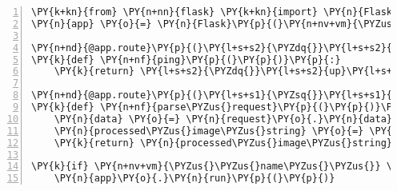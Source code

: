 \begin{Verbatim}[commandchars=\\\{\},numbers=left,firstnumber=1,stepnumber=1]
\PY{k+kn}{from} \PY{n+nn}{flask} \PY{k+kn}{import} \PY{n}{Flask}
\PY{n}{app} \PY{o}{=} \PY{n}{Flask}\PY{p}{(}\PY{n+nv+vm}{\PYZus{}\PYZus{}name\PYZus{}\PYZus{}}\PY{p}{)}
 
\PY{n+nd}{@app.route}\PY{p}{(}\PY{l+s+s2}{\PYZdq{}}\PY{l+s+s2}{/}\PY{l+s+s2}{\PYZdq{}}\PY{p}{)}
\PY{k}{def} \PY{n+nf}{ping}\PY{p}{(}\PY{p}{)}\PY{p}{:}
    \PY{k}{return} \PY{l+s+s2}{\PYZdq{}}\PY{l+s+s2}{up}\PY{l+s+s2}{\PYZdq{}}

\PY{n+nd}{@app.route}\PY{p}{(}\PY{l+s+s1}{\PYZsq{}}\PY{l+s+s1}{/image\PYZus{}process}\PY{l+s+s1}{\PYZsq{}}\PY{p}{,} \PY{n}{methods}\PY{o}{=}\PY{p}{[}\PY{l+s+s1}{\PYZsq{}}\PY{l+s+s1}{GET}\PY{l+s+s1}{\PYZsq{}}\PY{p}{,} \PY{l+s+s1}{\PYZsq{}}\PY{l+s+s1}{POST}\PY{l+s+s1}{\PYZsq{}}\PY{p}{]}\PY{p}{)}
\PY{k}{def} \PY{n+nf}{parse\PYZus{}request}\PY{p}{(}\PY{p}{)}\PY{p}{:}
    \PY{n}{data} \PY{o}{=} \PY{n}{request}\PY{o}{.}\PY{n}{data}
    \PY{n}{processed\PYZus{}image\PYZus{}string} \PY{o}{=} \PY{n}{process\PYZus{}image}\PY{p}{(}\PY{n}{data}\PY{p}{)}
    \PY{k}{return} \PY{n}{processed\PYZus{}image\PYZus{}string}
 
\PY{k}{if} \PY{n+nv+vm}{\PYZus{}\PYZus{}name\PYZus{}\PYZus{}} \PY{o}{==} \PY{l+s+s2}{\PYZdq{}}\PY{l+s+s2}{\PYZus{}\PYZus{}main\PYZus{}\PYZus{}}\PY{l+s+s2}{\PYZdq{}}\PY{p}{:}
    \PY{n}{app}\PY{o}{.}\PY{n}{run}\PY{p}{(}\PY{p}{)}
\end{Verbatim}
